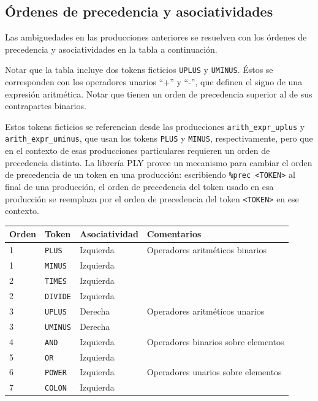 \documentclass[a4paper, 10pt, twoside]{article}
\begin{document}
\subsection{Órdenes de precedencia y asociatividades}

Las ambiguedades en las producciones anteriores se resuelven con los órdenes de precedencia y asociatividades en la tabla a continuación.

Notar que la tabla incluye dos tokens ficticios \texttt{UPLUS} y \texttt{UMINUS}. Éstos se corresponden con los operadores unarios ``+'' y ``-'', que definen el signo de una expresión aritmética. Notar que tienen un orden de precedencia superior al de sus contrapartes binarios.

Estos tokens ficticios se referencian desde las producciones \texttt{arith\_expr\_uplus} y \texttt{arith\_expr\_uminus}, que usan los tokens \texttt{PLUS} y \texttt{MINUS}, respectivamente, pero que en el contexto de esas producciones particulares requieren un orden de precedencia distinto. La librería PLY provee un mecanismo para cambiar el orden de precedencia de un token en una producción: escribiendo \texttt{\%prec \textless{}TOKEN\textgreater} al final de una producción, el orden de precedencia del token usado en esa producción se reemplaza por el orden de precedencia del token \texttt{\textless{}TOKEN\textgreater} en ese contexto.


\vspace{1em}
\begin{tabular}{llll}
  \hline
  Orden & Token           & Asociatividad & Comentarios\\
  \hline\hline
  1     & \texttt{PLUS}   & Izquierda     & Operadores aritméticos binarios\\
  1     & \texttt{MINUS}  & Izquierda     &\\
  2     & \texttt{TIMES}  & Izquierda     &\\
  2     & \texttt{DIVIDE} & Izquierda     &\\
  \hline
  3     & \texttt{UPLUS}  & Derecha       & Operadores aritméticos unarios\\
  3     & \texttt{UMINUS} & Derecha       &\\
  \hline
  4     & \texttt{AND}    & Izquierda     & Operadores binarios sobre elementos\\
  5     & \texttt{OR}     & Izquierda     &\\
  \hline
  6     & \texttt{POWER}  & Izquierda     & Operadores unarios sobre elementos\\
  7     & \texttt{COLON}  & Izquierda     &\\
  \hline
\end{tabular}
\end{document}
